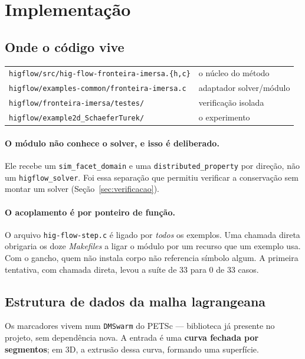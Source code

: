 \section{Implementação}
\label{sec:implementacao}

\subsection{Onde o código vive}

\begin{center}
\begin{tabular}{ll}
  \toprule
  \texttt{higflow/src/hig-flow-fronteira-imersa.\{h,c\}} & o núcleo do método \\
  \texttt{higflow/examples-common/fronteira-imersa.c}    & adaptador solver/módulo \\
  \texttt{higflow/fronteira-imersa/testes/}              & verificação isolada \\
  \texttt{higflow/example2d\_SchaeferTurek/}             & o experimento \\
  \bottomrule
\end{tabular}
\end{center}

\paragraph{O módulo não conhece o solver, e isso é deliberado.} Ele recebe um
\texttt{sim\_facet\_domain} e uma \texttt{distributed\_property} por direção, não
um \texttt{higflow\_solver}. Foi essa separação que permitiu verificar a
conservação sem montar um solver (Seção~\ref{sec:verificacao}).

\paragraph{O acoplamento é por ponteiro de função.} O arquivo
\texttt{hig-flow-step.c} é ligado por \emph{todos} os exemplos. Uma chamada
direta obrigaria os doze \emph{Makefiles} a ligar o módulo por um recurso que um
exemplo usa. Com o gancho, quem não instala corpo não referencia símbolo algum.
A primeira tentativa, com chamada direta, levou a suíte de 33 para 0 de 33 casos.

\subsection{Estrutura de dados da malha lagrangeana}

Os marcadores vivem num \texttt{DMSwarm} do PETSc --- biblioteca já presente no
projeto, sem dependência nova. A entrada é uma \textbf{curva fechada por
segmentos}; em 3D, a extrusão dessa curva, formando uma superfície.

